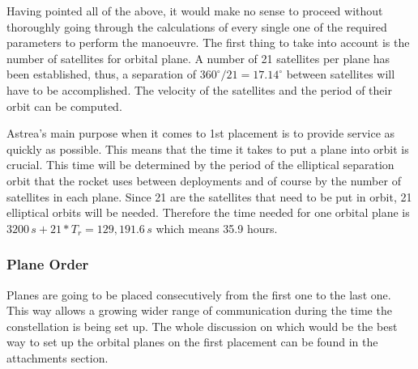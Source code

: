 Having pointed all of the above, it would make no sense to proceed without thoroughly going through the calculations of every single one of the required parameters to perform the manoeuvre. The first thing to take into account is the number of satellites for orbital plane. A number of 21 satellites per plane has been established, thus, a separation of $360^\circ/21 = 17.14^\circ$ between satellites will have to be accomplished. The velocity of the satellites and the period of their orbit can be computed. %
\newline\newline

Astrea's main purpose when it comes to 1st placement is to provide service as quickly as possible. This means that the time it takes to put a plane into orbit is crucial. This time will be determined by the period of the elliptical separation orbit that the rocket uses between deployments and of course by the number of satellites in each plane. Since 21 are the satellites that need to be put in orbit, 21 elliptical orbits will be needed. Therefore the time needed for one orbital plane is $3200\,s + 21*T_r = 129,191.6\,s$ which means 35.9 hours.
\subsubsection{Plane Order}
Planes are going to be placed consecutively from the first one to the last one. This way allows a growing wider range of communication during the time the constellation is being set up. The whole discussion on which would be the best way to set up the orbital planes on the first placement can be found in the attachments section.





